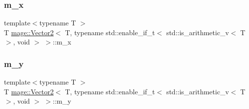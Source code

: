 \subsubsection{\texorpdfstring{m\+\_\+x}{m\_x}}
{\footnotesize\ttfamily template$<$typename T $>$ \\
T \hyperlink{structmage_1_1_vector2}{mage\+::\+Vector2}$<$ T, typename std\+::enable\+\_\+if\+\_\+t$<$ std\+::is\+\_\+arithmetic\+\_\+v$<$ T $>$, void $>$ $>$\+::m\+\_\+x}

\hypertarget{structmage_1_1_vector2_3_01_t_00_01typename_01std_1_1enable__if__t_3_01std_1_1is__arithmetic__v_3_01_t_01_4_00_01void_01_4_01_4_a11918fcf04043c20192ff5b1ded467b8}{}\label{structmage_1_1_vector2_3_01_t_00_01typename_01std_1_1enable__if__t_3_01std_1_1is__arithmetic__v_3_01_t_01_4_00_01void_01_4_01_4_a11918fcf04043c20192ff5b1ded467b8} 
\subsubsection{\texorpdfstring{m\+\_\+y}{m\_y}}
{\footnotesize\ttfamily template$<$typename T $>$ \\
T \hyperlink{structmage_1_1_vector2}{mage\+::\+Vector2}$<$ T, typename std\+::enable\+\_\+if\+\_\+t$<$ std\+::is\+\_\+arithmetic\+\_\+v$<$ T $>$, void $>$ $>$\+::m\+\_\+y}

